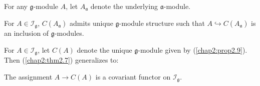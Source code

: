 For any $\mathfrak{g}$-module $A$, let $A_\mathfrak{a}$ denote the
underlying $\mathfrak{a}$-module.


\begin{prop}\label{chap2:prop2.9}
For $A \in \mathscr{I}_\mathfrak{g}$, $C(A_\mathfrak{a})$ admits
unique $\mathfrak{g}$-module structure such that $A \hookrightarrow
C(A_\mathfrak{a})$ is an inclusion of $\mathfrak{g}$-modules.
\end{prop}

For $A \in \mathscr{I}_\mathfrak{g}$, let $C(A)$ denote the unique
$\mathfrak{g}$-module given by (\ref{chap2:prop2.9}). Then
(\ref{chap2:thm2.7}) generalizes to:

\begin{theorem}\label{chap2:thm2.10}%
The assignment $A \to C(A)$ is a covariant functor on
$\mathscr{I}_\mathfrak{g}$. 
\end{theorem}


